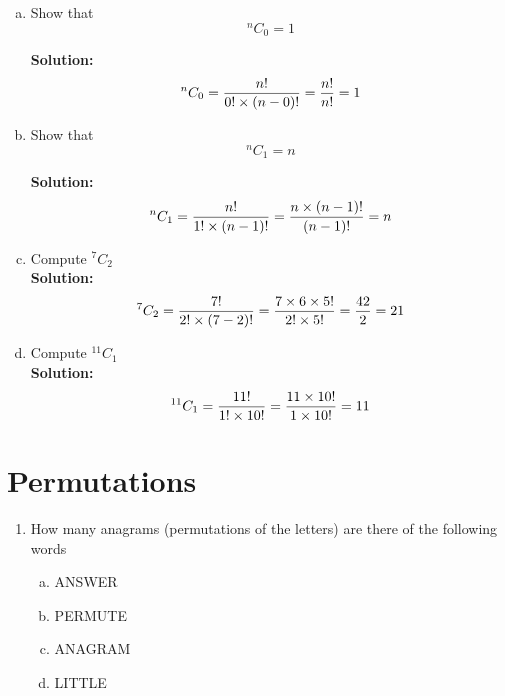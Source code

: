 \documentclass[]{article}
\begin{document}
\begin{enumerate}[(a)]
\item 	Show that
	\[ ^{n}C_0  = 1 \]
	
	\textbf{Solution: }
	\[ ^{n}C_0  = {n! \over 0!  \times (n-0)!} =  {n! \over n!} = 1 \]
	

\item 
	Show that
	\[ ^{n}C_1  = n \]
	
	\textbf{Solution: }
	\[ ^{n}C_1  = {n! \over 1!  \times (n-1)!} =  {n \times (n-1)! \over (n-1)!} = n \]
	


\item 	Compute $ ^{7}C_2  $\\
	
	\textbf{Solution: }
	\[ ^{7}C_2  = {7! \over 2!  \times (7-2)!} =  {7 \times 6 \times 5! \over 2! \times 5!} = {42 \over 2} =21  \]
	

\item Compute $ ^{11}C_1  $\\
	
	\textbf{Solution: }
	\[ ^{11}C_1  = {11! \over 1!  \times 10!} =  {11 \times 10! \over 1 \times 10!} = 11 \]
	
\end{enumerate}	
	
\section*{Permutations}

\begin{enumerate}
    \item How many anagrams (permutations of the letters) are there of the following words
\begin{enumerate}[(a)]
\item ANSWER
\item PERMUTE
\item ANAGRAM
\item LITTLE
\end{enumerate}

\end{enumerate}
\end{document}
